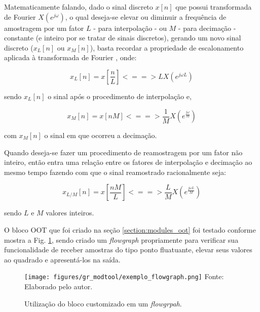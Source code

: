 \documentclass[
  12pt,				%
  openright,			%
  twoside,			%
  a4paper,			%
  english,			%
  french,				%
  spanish,			%
  brazil,				%
  ]{abntex2}
\begin{document}
Matematicamente falando, dado o sinal discreto $x[n]$ que possui transformada de Fourier $X(e^{j\omega})$, o qual deseja-se elevar ou diminuir a frequência de amostragem por um fator $L$
- para interpolação - ou $M$ - para decimação - constante (e inteiro por se tratar de sinais discretos), gerando um novo sinal discreto ($x_L[n]$ ou $x_M[n]$), basta recordar a propriedade de
escalonamento aplicada à transformada de Fourier \cite{Lathi:1998}, onde:

\begin{equation*}
  x_L[n] = x[\frac{n}{L}] <==> L X(e^{j\omega L})
\end{equation*}

sendo $x_L[n]$ o sinal após o procedimento de interpolação e,

\begin{equation*}
  x_M[n] = x[nM] <==> \frac{1}{M} X(e^{\frac{j\omega}{M}})
\end{equation*}

com $x_M[n]$ o sinal em que ocorreu a decimação.

Quando deseja-se fazer um procedimento de reamostragem por um fator não inteiro, então entra uma relação entre os fatores de interpolação e decimação ao mesmo tempo fazendo com que o sinal
reamostrado racionalmente seja:

\begin{equation*}
  x_{L/M}[n] = x[\frac{nM}{L}] <==> \frac{L}{M} X(e^{\frac{j\omega L}{M}})
\end{equation*}

sendo $L$ e $M$ valores inteiros.

O bloco OOT que foi criado na seção \ref{section:modules_oot} foi testado conforme mostra a Fig. \ref{fig:exemplo_flowgraph}, sendo criado um \textit{flowgraph} propriamente para verificar
sua funcionalidade de receber amostras do tipo ponto fluatuante, elevar seus valores ao quadrado e apresentá-los na saída.

\begin{figure}[!htb]
  \centering
  \caption{Utilização do bloco customizado em um \textit{flowgrpah}.}
  \texttt{[image: figures/gr\_modtool/exemplo\_flowgraph.png]}
  Fonte: Elaborado pelo autor.
  \label{fig:exemplo_flowgraph}
\end{figure}




\end{document}
